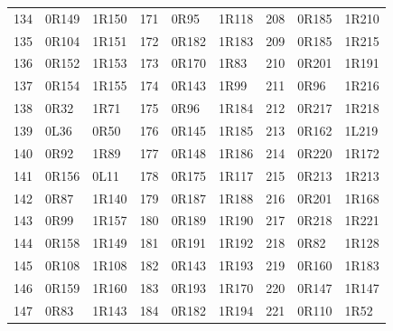 \begin{center}
\begin{tabular}{rll@{\qquad}rll@{\qquad}rll}
134 & 0R149 & 1R150 & 171 & 0R95 & 1R118 & 208 & 0R185 & 1R210\\
135 & 0R104 & 1R151 & 172 & 0R182 & 1R183 & 209 & 0R185 & 1R215\\
136 & 0R152 & 1R153 & 173 & 0R170 & 1R83 & 210 & 0R201 & 1R191\\
137 & 0R154 & 1R155 & 174 & 0R143 & 1R99 & 211 & 0R96 & 1R216\\
138 & 0R32 & 1R71 & 175 & 0R96 & 1R184 & 212 & 0R217 & 1R218\\
139 & 0L36 & 0R50 & 176 & 0R145 & 1R185 & 213 & 0R162 & 1L219\\
140 & 0R92 & 1R89 & 177 & 0R148 & 1R186 & 214 & 0R220 & 1R172\\
141 & 0R156 & 0L11 & 178 & 0R175 & 1R117 & 215 & 0R213 & 1R213\\
142 & 0R87 & 1R140 & 179 & 0R187 & 1R188 & 216 & 0R201 & 1R168\\
143 & 0R99 & 1R157 & 180 & 0R189 & 1R190 & 217 & 0R218 & 1R221\\
144 & 0R158 & 1R149 & 181 & 0R191 & 1R192 & 218 & 0R82 & 1R128\\
145 & 0R108 & 1R108 & 182 & 0R143 & 1R193 & 219 & 0R160 & 1R183\\
146 & 0R159 & 1R160 & 183 & 0R193 & 1R170 & 220 & 0R147 & 1R147\\
147 & 0R83 & 1R143 & 184 & 0R182 & 1R194 & 221 & 0R110 & 1R52\\
\bottomrule
\end{tabular}
\end{center}
\normalsize
